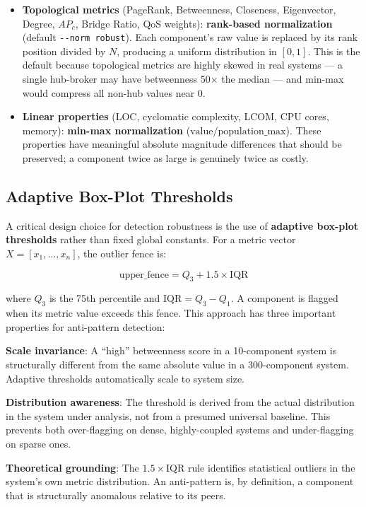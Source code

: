 \documentclass[11pt]{article}
\begin{document}
\begin{itemize}[leftmargin=*]
\item \textbf{Topological metrics} (PageRank, Betweenness, Closeness, Eigenvector, Degree, $AP_c$, Bridge Ratio, QoS weights): \textbf{rank-based normalization} (default \texttt{-{}-norm robust}). Each component's raw value is replaced by its rank position divided by $N$, producing a uniform distribution in $[0,1]$. This is the default because topological metrics are highly skewed in real systems --- a single hub-broker may have betweenness 50$\times$ the median --- and min-max would compress all non-hub values near 0.
\item \textbf{Linear properties} (LOC, cyclomatic complexity, LCOM, CPU cores, memory): \textbf{min-max normalization} ($\text{value} / \text{population\_max}$). These properties have meaningful absolute magnitude differences that should be preserved; a component twice as large is genuinely twice as costly.
\end{itemize}

\subsection{Adaptive Box-Plot Thresholds}

A critical design choice for detection robustness is the use of \textbf{adaptive box-plot thresholds} rather than fixed global constants. For a metric vector $X = [x_1, \ldots, x_n]$, the outlier fence is:

\[
\text{upper\_fence} = Q_3 + 1.5 \times \mathrm{IQR}
\]

where $Q_3$ is the 75th percentile and $\mathrm{IQR} = Q_3 - Q_1$. A component is flagged when its metric value exceeds this fence. This approach has three important properties for anti-pattern detection:

\textbf{Scale invariance}: A ``high'' betweenness score in a 10-component system is structurally different from the same absolute value in a 300-component system. Adaptive thresholds automatically scale to system size.

\textbf{Distribution awareness}: The threshold is derived from the actual distribution in the system under analysis, not from a presumed universal baseline. This prevents both over-flagging on dense, highly-coupled systems and under-flagging on sparse ones.

\textbf{Theoretical grounding}: The $1.5\times\mathrm{IQR}$ rule identifies statistical outliers in the system's own metric distribution. An anti-pattern is, by definition, a component that is structurally anomalous relative to its peers.
\end{document}
